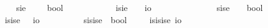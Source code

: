 \begin{isabellebody}
\ \ \isamarkupfalse%
\ sie\ {\isacharequal}\ \ \ \ {\isachardoublequoteopen}{\isacharparenleft}{\isasymup}{\isasymzero}{\isasymRightarrow}bool{\isacharparenright}{\isachardoublequoteclose}\ \ \ \ \ \ \ \ {\isacharparenleft}{\isachardoublequoteopen}{\isasymlangle}{\isasymup}{\isasymzero}{\isasymrangle}{\isachardoublequoteclose}{\isacharparenright}\isanewline
\ \ \isamarkupfalse%
\ isie\ {\isacharequal}\ \ \ {\isachardoublequoteopen}{\isacharparenleft}{\isasymup}{\isasymzero}{\isasymRightarrow}io{\isacharparenright}{\isachardoublequoteclose}\ \ \ \ \ \ \ \ \ {\isacharparenleft}{\isachardoublequoteopen}{\isasymup}{\isasymlangle}{\isasymup}{\isasymzero}{\isasymrangle}{\isachardoublequoteclose}{\isacharparenright}\ \ \isanewline
\ \ \isamarkupfalse%
\ sise\ {\isacharequal}\ \ \ {\isachardoublequoteopen}{\isacharparenleft}{\isasymup}{\isasymlangle}{\isasymzero}{\isasymrangle}{\isasymRightarrow}bool{\isacharparenright}{\isachardoublequoteclose}\ \ \ \ \ {\isacharparenleft}{\isachardoublequoteopen}{\isasymlangle}{\isasymup}{\isasymlangle}{\isasymzero}{\isasymrangle}{\isasymrangle}{\isachardoublequoteclose}{\isacharparenright}\isanewline
\ \ \isamarkupfalse%
\ isise\ {\isacharequal}\ \ {\isachardoublequoteopen}{\isacharparenleft}{\isasymup}{\isasymlangle}{\isasymzero}{\isasymrangle}{\isasymRightarrow}io{\isacharparenright}{\isachardoublequoteclose}\ \ \ \ \ \ {\isacharparenleft}{\isachardoublequoteopen}{\isasymup}{\isasymlangle}{\isasymup}{\isasymlangle}{\isasymzero}{\isasymrangle}{\isasymrangle}{\isachardoublequoteclose}{\isacharparenright}\isanewline
\ \ \isamarkupfalse%
\ sisise{\isacharequal}\ \ {\isachardoublequoteopen}{\isacharparenleft}{\isasymup}{\isasymlangle}{\isasymup}{\isasymlangle}{\isasymzero}{\isasymrangle}{\isasymrangle}{\isasymRightarrow}bool{\isacharparenright}{\isachardoublequoteclose}\ {\isacharparenleft}{\isachardoublequoteopen}{\isasymlangle}{\isasymup}{\isasymlangle}{\isasymup}{\isasymlangle}{\isasymzero}{\isasymrangle}{\isasymrangle}{\isasymrangle}{\isachardoublequoteclose}{\isacharparenright}\isanewline
\ \ \isamarkupfalse%
\ isisise{\isacharequal}\ {\isachardoublequoteopen}{\isacharparenleft}{\isasymup}{\isasymlangle}{\isasymup}{\isasymlangle}{\isasymzero}{\isasymrangle}{\isasymrangle}{\isasymRightarrow}io{\isacharparenright}{\isachardoublequoteclose}\ \ {\isacharparenleft}{\isachardoublequoteopen}{\isasymup}{\isasymlangle}{\isasymup}{\isasymlangle}{\isasymup}{\isasymlangle}{\isasymzero}{\isasymrangle}{\isasymrangle}{\isasymrangle}{\isachardoublequoteclose}{\isacharparenright}\isanewline

\end{isabellebody}
